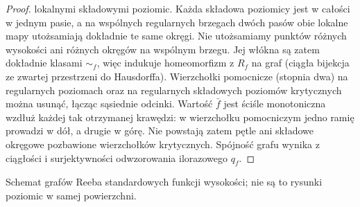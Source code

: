 \begin{proof}
lokalnymi składowymi poziomic. Każda składowa
poziomicy jest w całości w jednym pasie, a na wspólnych
regularnych brzegach dwóch pasów obie lokalne mapy
utożsamiają dokładnie te same okręgi. Nie utożsamiamy
punktów różnych wysokości ani różnych okręgów
na wspólnym brzegu. Jej włókna są zatem dokładnie
klasami $\sim_f$, więc
indukuje homeomorfizm z $R_f$ na graf (ciągła
bijekcja ze zwartej przestrzeni do Hausdorffa).
Wierzchołki pomocnicze (stopnia dwa) na regularnych
poziomach oraz na regularnych składowych poziomów
krytycznych można usunąć, łącząc sąsiednie odcinki.
Wartość $\bar f$ jest ściśle monotoniczna wzdłuż
każdej tak otrzymanej krawędzi: w wierzchołku
pomocniczym jedno ramię prowadzi w dół, a drugie
w górę. Nie powstają zatem pętle ani składowe
okręgowe pozbawione wierzchołków krytycznych.
Spójność grafu wynika z
ciągłości i surjektywności odwzorowania ilorazowego $q_f$.
\end{proof}

\begin{samepage}
\begin{center}
\begin{minipage}{.96\linewidth}\centering
{}\par\smallskip

{\footnotesize Schemat grafów Reeba standardowych funkcji wysokości;
nie są to rysunki poziomic w samej powierzchni.}
\end{minipage}
\end{center}
\end{samepage}

